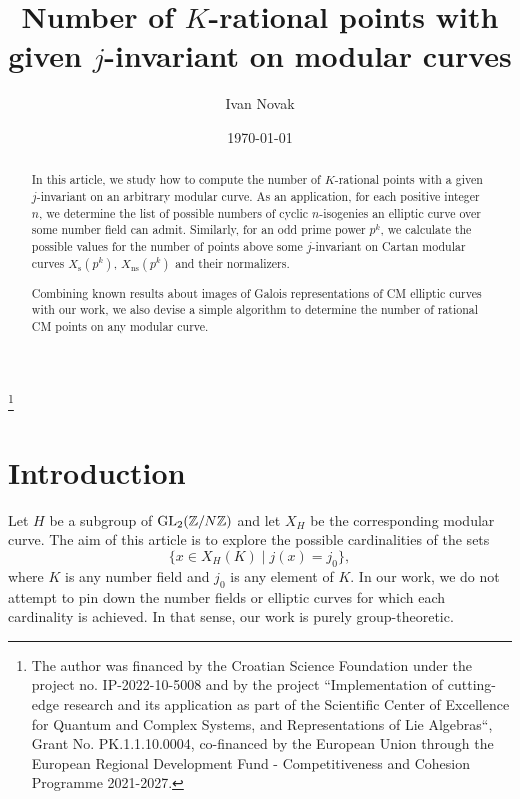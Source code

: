 \documentclass[10pt,leqno]{amsart}
\newcommand{\Z}{\mathbb{Z}}
\newcommand{\GL}{\textnormal{GL}}
\theoremstyle{definition}
\theoremstyle{remark}
\numberwithin{theorem}{section}
\begin{document}
\title{Number of $K$-rational points with given $j$-invariant on modular curves} %
\author[Initial Surname]{Ivan Novak}
\date{\today}
\address{Ivan Novak, University of Zagreb, Faculty of Science, Department of Mathematics, Bijeni\v{c}ka Cesta 30, 10000 Zagreb, Croatia}
\thanks{The author was financed by the Croatian
Science Foundation under the project no. IP-2022-10-5008 and by the project “Implementation of cutting-edge research and its application as part of the Scientific Center of Excellence for Quantum and Complex Systems, and Representations of Lie Algebras“, Grant No. PK.1.1.10.0004, co-financed by the European Union through the European Regional Development Fund - Competitiveness and Cohesion Programme 2021-2027.}

\maketitle

\let\thefootnote\relax

\begin{abstract}
In this article, we study how to compute the number of $K$-rational points with a given $j$-invariant on an arbitrary modular curve.  As an application, for each positive integer $n$, we determine the list of possible numbers of cyclic $n$-isogenies an elliptic curve over some number field can admit. Similarly, for an odd prime power $p^k$, we calculate the possible values for the number of points above some $j$-invariant on Cartan modular curves $X_{\mathrm s}(p^k)$, $X_{\mathrm{ns}}(p^k)$ and their normalizers. 

Combining known results about images of Galois representations of CM elliptic curves with our work, we also devise a simple algorithm to determine the number of rational CM points on any modular curve.

\end{abstract} %

\bigskip

\section{Introduction}

Let $H$ be a subgroup of $\GL_2(\Z/N\Z)$ and let $X_H$ be the corresponding modular curve. The aim of this article is to explore the possible cardinalities of the sets $$\{ x \in X_H(K) \mid j(x)=j_0\},$$ where $K$ is any number field and $j_0$ is any element of $K$. In our work, we do not attempt to pin down the number fields or elliptic curves for which each cardinality is achieved. In that sense, our work is purely group-theoretic.
\end{document}
